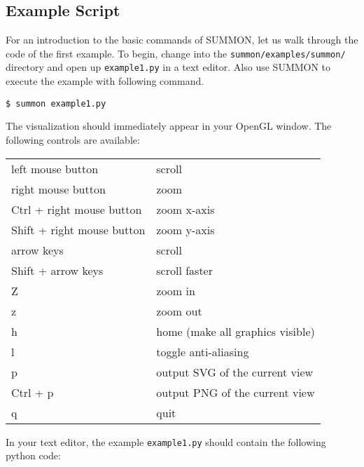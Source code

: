 \documentclass[12pt]{article}
\newcommand{\code}[1]{{\tt #1}}
\newcommand{\codeblock}[1]{\vspace{.1in} {\tt #1} \vspace{.1in}}
\begin{document}
\subsection{Example Script}

For an introduction to the basic commands of SUMMON, let us walk through the
code of the first example.  To begin, change into the
\code{summon/examples/summon/} directory and open up \code{example1.py} in a
text editor.  Also use SUMMON to execute the example with following command.

\codeblock{\$ summon example1.py}

The visualization should immediately appear in your OpenGL window.  The
following controls are available:

\vspace{.1in}
\begin{tabular}{ll}
    left mouse button          & scroll \\
    right mouse button         & zoom \\
    Ctrl + right mouse button  & zoom x-axis \\
    Shift + right mouse button & zoom y-axis \\
    arrow keys                 & scroll \\
    Shift + arrow keys         & scroll faster \\
    Z                          & zoom in \\
    z                          & zoom out \\
    h                          & home (make all graphics visible) \\
    l                          & toggle anti-aliasing \\
    p                          & output SVG of the current view \\
    Ctrl + p                   & output PNG of the current view \\
    q                          & quit \\
\end{tabular}
\vspace{.2in}



In your text editor, the example \code{example1.py} should contain the 
following python code:
\end{document}
